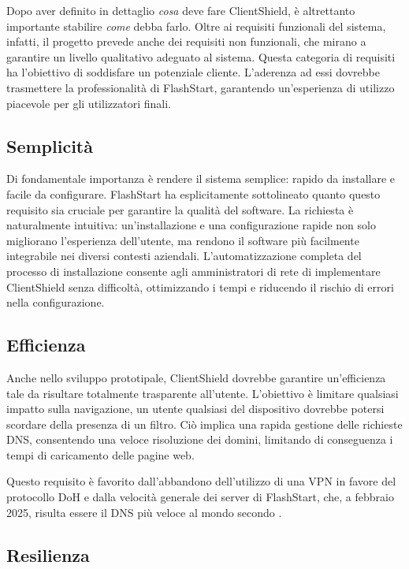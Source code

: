 \documentclass[12pt,a4paper,openright,twoside]{book}
\begin{document}
Dopo aver definito in dettaglio \textit{cosa} deve fare ClientShield, è altrettanto importante stabilire \textit{come} debba farlo.
Oltre ai requisiti funzionali del sistema, infatti, il progetto prevede anche dei requisiti non funzionali, che mirano a garantire un livello qualitativo adeguato al sistema.
Questa categoria di requisiti ha l'obiettivo di soddisfare un potenziale cliente.
L'aderenza ad essi dovrebbe trasmettere la professionalità di FlashStart, garantendo un'esperienza di utilizzo piacevole per gli utilizzatori finali.

\subsection*{Semplicità}

Di fondamentale importanza è rendere il sistema semplice: rapido da installare e facile da configurare.  
FlashStart ha esplicitamente sottolineato quanto questo requisito sia cruciale per garantire la qualità del software.
La richiesta è naturalmente intuitiva: un'installazione e una configurazione rapide non solo migliorano l’esperienza dell’utente, ma rendono il software più facilmente integrabile nei diversi contesti aziendali.  
L'automatizzazione completa del processo di installazione consente agli amministratori di rete di implementare ClientShield senza difficoltà, ottimizzando i tempi e riducendo il rischio di errori nella configurazione.  

\subsection*{Efficienza}

Anche nello sviluppo prototipale, ClientShield dovrebbe garantire un'efficienza tale da risultare totalmente trasparente all'utente.
L'obiettivo è limitare qualsiasi impatto sulla navigazione, un utente qualsiasi del dispositivo dovrebbe potersi scordare della presenza di un filtro.
Ciò implica una rapida gestione delle richieste \gls{DNS}, consentendo una veloce risoluzione dei domini, limitando di conseguenza i tempi di caricamento delle pagine web.

Questo requisito è favorito dall'abbandono dell'utilizzo di una \gls{VPN} in favore del protocollo \gls{DoH} e dalla velocità generale dei server di FlashStart, che, a febbraio 2025, risulta essere il \gls{DNS} più veloce al mondo secondo \cite{DNSPerf2025}.

\subsection*{Resilienza}
\end{document}
